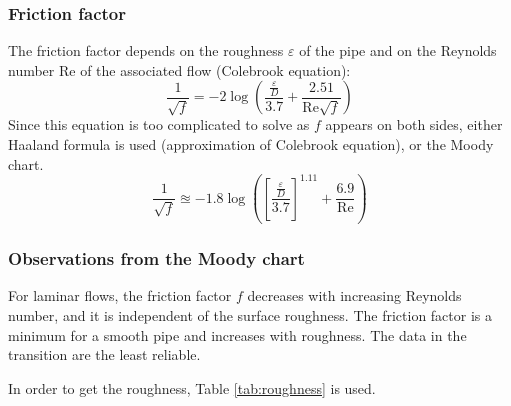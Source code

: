 \documentclass[10pt, twocolumn]{article}
\begin{document}
\subsubsection{Friction factor}
The friction factor depends on the roughness \(\varepsilon\) of the pipe and on the Reynolds number Re of the associated flow (Colebrook equation):
\[
  \frac{1}{\sqrt{f}} = -2 \log\left( \frac{\frac{\varepsilon}{D}}{3.7} + \frac{2.51}{\mathrm{Re}\sqrt{f}} \right)
\]
Since this equation is too complicated to solve as \(f\) appears on both sides, either Haaland formula is used (approximation of Colebrook equation), or the Moody chart.
\[
  \frac{1}{\sqrt{f}} \approxeq -1.8 \log\left( \left[ \frac{\frac{\varepsilon}{D}}{3.7} \right]^{1.11} + \frac{6.9}{\mathrm{Re}} \right)
\]


\subsubsection{Observations from the Moody chart}
For laminar flows, the friction factor \(f\) decreases with increasing Reynolds number, and it is independent of the surface roughness.
The friction factor is a minimum for a smooth pipe and increases with roughness.
The data in the transition are the least reliable.

In order to get the roughness, Table \ref{tab:roughness} is used.
\end{document}
